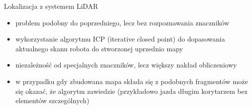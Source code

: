 \begin{frame}
{Lokalizacja z systemem LiDAR}
	\begin{itemize}
		\item problem podobny do poprzedniego, lecz bez rozpoznawania znaczników
		\item wykorzystanie algorytmu ICP (iterative closed point) do dopasowania aktualnego skanu robota do stworzonej uprzednio mapy
		\item niezależność od specjalnych znaczników, lecz większy nakład obliczeniowy
		\item w przypadku gdy zbudowana mapa składa się z podobnych fragmentów może się okazać, że algorytm zawiedzie (przykładowo jazda długim korytarzem bez elementów szczególnych)
	\end{itemize}
\end{frame}


